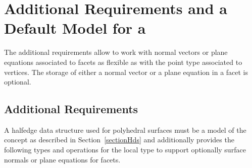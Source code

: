 \section{Additional Requirements and a Default Model for a
          \protect{}}
\label{sectionPolyHds}

The additional requirements allow to work with normal vectors or plane
equations associated to facets as flexible as with the point type
associated to vertices. The storage of either a normal vector or a
plane equation in a facet is optional.

\subsection{Additional Requirements}

\ccThreeToTwo

\ccDefinition

A halfedge data structure used for polyhedral surfaces must be a model
of the  concept as described in
Section~\ref{sectionHds} and additionally provides the following types
and operations for the local  type to support optionally
surface normals or plane equations for facets.

